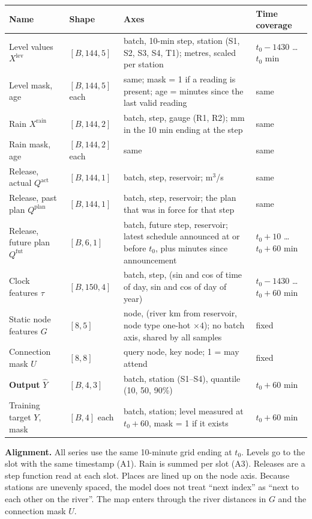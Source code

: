\documentclass[11pt,a4paper]{article}
\begin{document}
\begin{longtable}{|L{3.1cm}|L{2.2cm}|L{6.8cm}|L{3.1cm}|}
\hline
\textbf{Name} & \textbf{Shape} & \textbf{Axes} & \textbf{Time coverage} \\ \hline
\endhead
Level values $X^{\text{lev}}$ & $[B,144,5]$ & batch, 10-min step, station (S1, S2, S3, S4, T1); metres, scaled per station & $t_0-1430$ \dots\ $t_0$ min \\ \hline
Level mask, age & $[B,144,5]$ each & same; mask = 1 if a reading is present; age = minutes since the last valid reading & same \\ \hline
Rain $X^{\text{rain}}$ & $[B,144,2]$ & batch, step, gauge (R1, R2); mm in the 10 min ending at the step & same \\ \hline
Rain mask, age & $[B,144,2]$ each & same & same \\ \hline
Release, actual $Q^{\text{act}}$ & $[B,144,1]$ & batch, step, reservoir; m$^3$/s & same \\ \hline
Release, past plan $Q^{\text{plan}}$ & $[B,144,1]$ & batch, step, reservoir; the plan that was in force for that step & same \\ \hline
Release, future plan $Q^{\text{fut}}$ & $[B,6,1]$ & batch, future step, reservoir; latest schedule announced at or before $t_0$, plus minutes since announcement & $t_0+10$ \dots\ $t_0+60$ min \\ \hline
Clock features $\tau$ & $[B,150,4]$ & batch, step, (sin and cos of time of day, sin and cos of day of year) & $t_0-1430$ \dots\ $t_0+60$ min \\ \hline
Static node features $G$ & $[8,5]$ & node, (river km from reservoir, node type one-hot $\times 4$); no batch axis, shared by all samples & fixed \\ \hline
Connection mask $U$ & $[8,8]$ & query node, key node; 1 = may attend & fixed \\ \hline
\textbf{Output} $\hat{Y}$ & $[B,4,3]$ & batch, station (S1--S4), quantile (10, 50, 90\%) & $t_0+60$ min \\ \hline
Training target $Y$, mask & $[B,4]$ each & batch, station; level measured at $t_0+60$, mask = 1 if it exists & $t_0+60$ min \\ \hline
\end{longtable}

\textbf{Alignment.} All series use the same 10-minute grid ending at $t_0$. Levels go to the slot with the same timestamp (A1). Rain is summed per slot (A3). Releases are a step function read at each slot. Places are lined up on the node axis. Because stations are unevenly spaced, the model does not treat ``next index'' as ``next to each other on the river''. The map enters through the river distances in $G$ and the connection mask $U$.
\end{document}
